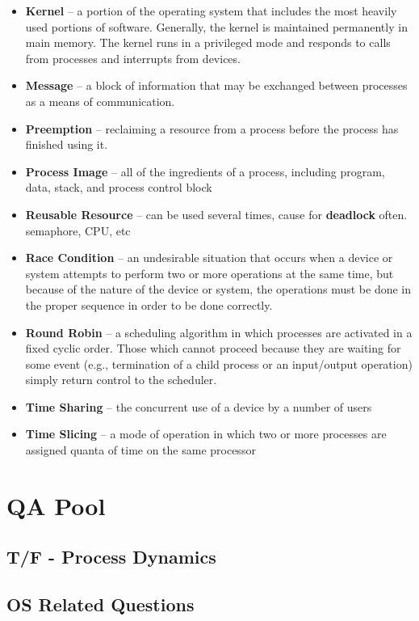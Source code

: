 \documentclass[fontsize=5pt]{scrartcl}
\begin{document}
\begin{multicols}{3}
\begin{itemize}
      \item \textbf{Kernel} – a portion of the operating system that includes the most heavily used portions of software.  Generally, the kernel is maintained permanently in main memory.  
              The kernel runs in a privileged mode and responds to calls from processes and interrupts from devices.
      \item \textbf{Message} – a block of information that may be exchanged between processes as a means of communication.
      \item \textbf{Preemption} – reclaiming a resource from a process before the process has finished using it.
      \item \textbf{Process Image} – all of the ingredients of a process, including program, data, stack, and process control block
      \item \textbf{Reusable Resource} – can be used several times, cause for \textbf{deadlock} often. semaphore, CPU, etc
      \item \textbf{Race Condition} – an undesirable situation that occurs when a device or system attempts to perform two or more operations at the same time, but because of the nature of the device or system, 
      the operations must be done in the proper sequence in order to be done correctly.
      \item \textbf{Round Robin} – a scheduling algorithm in which processes are activated in a fixed cyclic order.  Those which cannot proceed because they are waiting for some event 
                    (e.g., termination of a child process or an input/output operation) simply return control to the scheduler.
      \item \textbf{Time Sharing} – the concurrent use of a device by a number of users
      \item \textbf{Time Slicing} – a mode of operation in which two or more processes are assigned quanta of time on the same processor
    \end{itemize}
    
    
  \section{QA Pool}
    \subsection{T/F - Process Dynamics}

    \subsection{OS Related Questions}


  \end{multicols}
\end{document}
